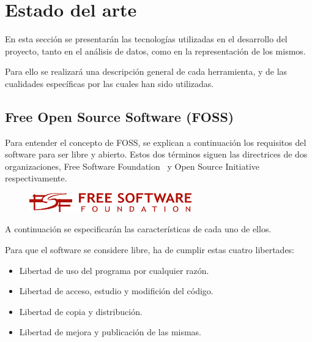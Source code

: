 \documentclass[a4paper, spanish, 12pt]{book}
\begin{document}

\cleardoublepage
\chapter{Estado del arte}

En esta secci\'on se presentar\'an las tecnolog\'ias utilizadas en el desarrollo
del proyecto, tanto en el an\'alisis de datos, como en la representaci\'on de los
mismos.

Para ello se realizar\'a una descripci\'on general de cada herramienta, y de las
cualidades espec\'ificas por las cuales han sido utilizadas.

\section{Free Open Source Software (FOSS)}
\label{sec:FOSS}

Para entender el concepto de FOSS, se explican a continuaci\'on los requisitos
del software para ser libre y abierto. Estos dos t\'erminos siguen las directrices
de dos organizaciones, Free Software Foundation~\cite{fsf} y
Open Source Initiative~\cite{opensource} respectivamente.

\begin{figure}[H]
  \centering
  \includegraphics[width=7cm, keepaspectratio]{img/fsf}
\end{figure}

A continuaci\'on se especificar\'an las caracter\'isticas de cada uno de ellos.

Para que el software se considere libre, ha de cumplir estas cuatro libertades:

\begin{itemize}

\item Libertad de uso del programa por cualquier raz\'on.

\item Libertad de acceso, estudio y modifici\'on del c\'odigo.

\item Libertad de copia y distribuci\'on.

\item Libertad de mejora y publicaci\'on de las mismas.

\end{itemize}
\end{document}
